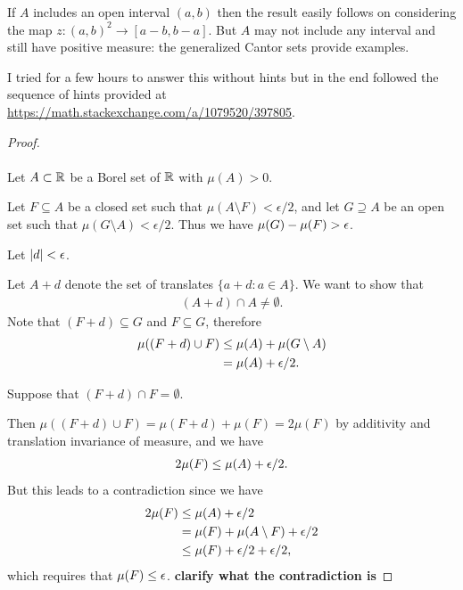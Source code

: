 \begin{remark*}
  If $A$ includes an open interval $(a, b)$ then the result easily follows on considering the
  map $z:(a, b)^2\to [a-b, b-a]$. But $A$ may not include any interval and still have positive measure: the
  generalized Cantor sets provide examples.
\end{remark*}

\begin{remark*}
  I tried for a few hours to answer this without hints but in the end followed the sequence of hints provided
  at \url{https://math.stackexchange.com/a/1079520/397805}.
\end{remark*}

\begin{proof}~\\~\\
  Let $A \subset \mathbb{R}$ be a Borel set of $\mathbb{R}$ with $\mu(A) > 0$.

  Let $F \subseteq A$ be a closed set such that $\mu(A \setminus F) < \epsilon/2$, and let $G \supseteq A$ be
  an open set such that $\mu(G \setminus A) < \epsilon/2$. Thus we have $\mu(G) - \mu(F) > \epsilon$.

  Let $|d| < \epsilon$.

  Let $A + d$ denote the set of translates $\{a + d : a \in A\}$. We want to show that
  \begin{align*}
    (A + d) \cap A \neq \emptyset.
  \end{align*}
  Note that $(F + d) \subseteq G$ and $F \subseteq G$, therefore
  \begin{align*}
    \mu((F + d) \cup F)
    &\leq \mu(A) + \mu(G \setminus A) \\
    &= \mu(A) + \epsilon/2.
  \end{align*}

  Suppose that $(F + d) \cap F = \emptyset$.

  Then $\mu((F + d) \cup F) = \mu(F + d) + \mu(F) = 2\mu(F)$ by additivity and translation invariance of
  measure, and we have
  \begin{align*}
    2\mu(F) \leq \mu(A) + \epsilon/2.
  \end{align*}
  But this leads to a contradiction since we have
  \begin{align*}
    2\mu(F)
    &\leq \mu(A) + \epsilon/2 \\
    &=    \mu(F) + \mu(A \setminus F) + \epsilon/2 \\
    &\leq \mu(F) + \epsilon/2 + \epsilon/2,
  \end{align*}
  which requires that $\mu(F) \leq \epsilon$.  {\bf clarify what the contradiction is}
\end{proof}


